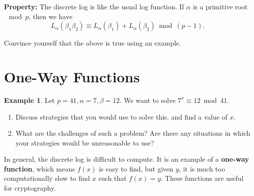 \documentclass[12pt]{amsart}
\theoremstyle{plain}
\theoremstyle{definition}
\newtheorem*{ex}{Example}
\theoremstyle{remark}
\begin{document}
\begin{framed}
\textbf{Property:} The discrete log is like the usual log function.  If $\alpha$ is a primitive root $\mod p$, then we have $$L_{\alpha}(\beta_1\beta_2) \equiv L_{\alpha}(\beta_1) + L_{\alpha}(\beta_2) \bmod (p-1).$$
\end{framed}

Convince yourself that the above is true using an example.\\ 


\newpage \section{One-Way Functions} 

\begin{ex} Let $p = 41, \alpha = 7, \beta = 12$.  We want to solve $7^x \equiv 12 \bmod 41$.
\begin{enumerate}[1.] 
	\item Discuss strategies that you would use to solve this, and find a value of $x$.\\ \vspace{3in}
	\item What are the challenges of such a problem? Are there any situations in which your strategies would be unreasonable to use?\\ \vspace{2in}
\end{enumerate}
\end{ex}

\begin{framed}
In general, the discrete log is difficult to compute.  It is an example of a \textbf{one-way function}, which means $f(x)$ is easy to find, but given $y$, it is much too computationally slow to find $x$ such that $f(x) = y$.  These functions are useful for cryptography.
\end{framed}
\end{document}
